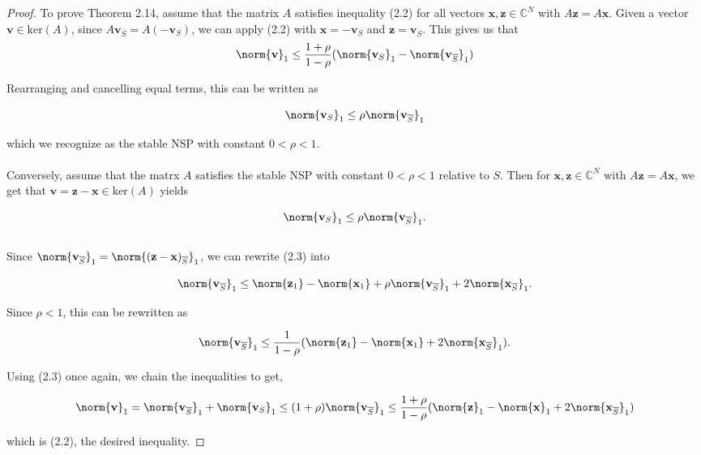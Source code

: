 \begin{proof}
To prove Theorem 2.14, assume that the matrix $A$ satisfies inequality (2.2) for all vectors $\mathbf{x,z} \in \mathbb{C}^N$ with $A\mathbf{z} = A\mathbf{x}$. Given a vector $\mathbf{v} \in \text{ker}(A)$, since  $A\mathbf{v}_{\overline{S}} = A(\mathbf{-v}_S)$, we can apply (2.2) with $\mathbf{x} = \mathbf{-v}_S$ and $\mathbf{z} = \mathbf{v}_{\overline{S}}$. This gives us that
\begin{equation*}
\norm{\mathbf{v}}_{1} \leq \frac{1 + \rho}{1 - \rho}(\norm{\mathbf{v}_S}_1-\norm{\mathbf{v}_{\overline{S}}}_1)
\end{equation*}

Rearranging and cancelling equal terms, this can be written as

\begin{equation*}
\norm{ \mathbf{v}_{S}}_{1}  \leq  \rho \norm{ \mathbf{v}_{\overline{S}}}_{1} 
\end{equation*}

which we recognize as the stable NSP with constant $0 < \rho < 1$. 
\\ \\Conversely, assume that the matrx $A$ satisfies the stable NSP with constant $0 < \rho < 1$ relative to $S$.  Then for $\mathbf{x,z} \in \mathbb{C}^N$ with $A\mathbf{z} = A\mathbf{x}$, we get that $\mathbf{v = z-x} \in \text{ker}(A)$ yields 

\begin{equation}
\norm{ \mathbf{v}_{S}}_{1}  \leq  \rho \norm{ \mathbf{v}_{\overline{S}}}_{1}. 
\end{equation}
\\Since $\norm{ \mathbf{v}_{\overline{S}}}_{1} = \norm{ \mathbf{(z-x)}_{\overline{S}}}_{1}$, we can rewrite (2.3) into

\begin{equation*}
\norm{ \mathbf{v}_{\overline{S}}}_{1} \leq \norm{ \mathbf{z}_{1}} - \norm{ \mathbf{x}_{1}} + \rho \norm{ \mathbf{v}_{\overline{S}}}_{1} + 2 \norm{ \mathbf{x}_{\overline{S}}}_{1}.
\end{equation*}

Since $\rho < 1$, this can be rewritten as 

\begin{equation*}
\norm{ \mathbf{v}_{\overline{S}}}_{1} \leq \frac{1}{1-\rho}(\norm{ \mathbf{z}_{1}} - \norm{ \mathbf{x}_{1}} + 2 \norm{ \mathbf{x}_{\overline{S}}}_{1}).
\end{equation*}

Using (2.3) once again, we chain the inequalities to get,

\begin{equation*}
\norm{\mathbf{v}}_1 = \norm{ \mathbf{v}_{\overline{S}}}_{1} + \norm{\mathbf{v}_S}_{1} \leq (1+\rho)\norm{ \mathbf{v}_{\overline{S}}}_{1} \leq \frac{1+\rho}{1-\rho}(\norm{ \mathbf{z}}_{1} - \norm{ \mathbf{x}}_{1} + 2 \norm{ \mathbf{x}_{\overline{S}}}_{1})
\end{equation*}

which is (2.2), the desired inequality.


\end{proof}




